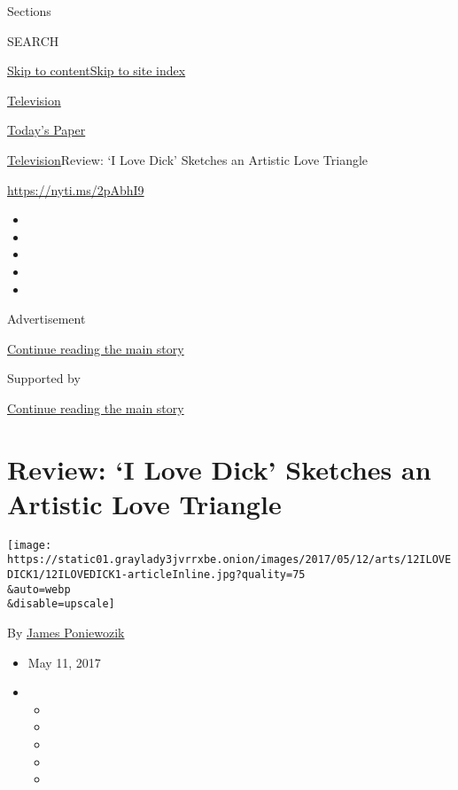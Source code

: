 Sections

SEARCH

\protect\hyperlink{site-content}{Skip to
content}\protect\hyperlink{site-index}{Skip to site index}

\href{https://www.nytimes3xbfgragh.onion/section/arts/television}{Television}

\href{https://myaccount.nytimes3xbfgragh.onion/auth/login?response_type=cookie\&client_id=vi}{}

\href{https://www.nytimes3xbfgragh.onion/section/todayspaper}{Today's
Paper}

\href{/section/arts/television}{Television}\textbar{}Review: `I Love
Dick' Sketches an Artistic Love Triangle

\url{https://nyti.ms/2pAbhI9}

\begin{itemize}
\item
\item
\item
\item
\item
\end{itemize}

Advertisement

\protect\hyperlink{after-top}{Continue reading the main story}

Supported by

\protect\hyperlink{after-sponsor}{Continue reading the main story}

\hypertarget{review-i-love-dick-sketches-an-artistic-love-triangle}{%
\section{Review: `I Love Dick' Sketches an Artistic Love
Triangle}\label{review-i-love-dick-sketches-an-artistic-love-triangle}}

\texttt{[image: https://static01.graylady3jvrrxbe.onion/images/2017/05/12/arts/12ILOVEDICK1/12ILOVEDICK1-articleInline.jpg?quality=75\\\&auto=webp\\\&disable=upscale]}

By \href{https://www.nytimes3xbfgragh.onion/by/james-poniewozik}{James
Poniewozik}

\begin{itemize}
\item
  May 11, 2017
\item
  \begin{itemize}
  \item
  \item
  \item
  \item
  \item
  \end{itemize}
\end{itemize}

